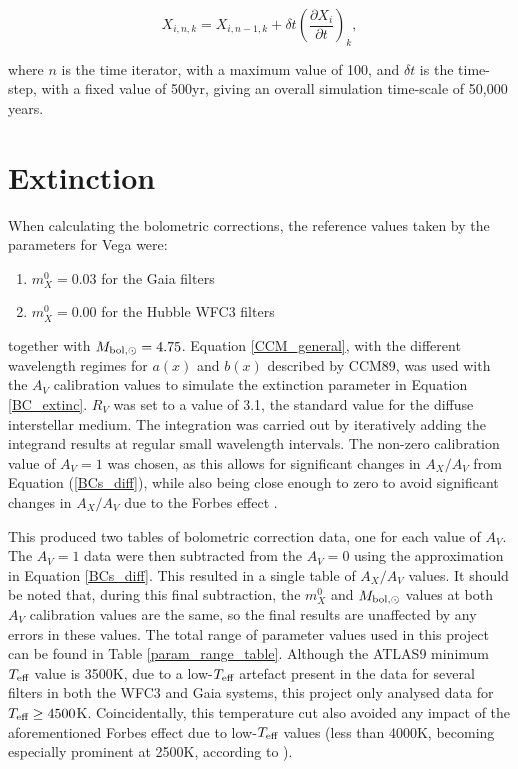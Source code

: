\documentclass[12pt, a4paper]{report}
\begin{document}
\begin{equation}
X_{i,n,k} = X_{i,n-1,k} + \delta t \left( \frac{\partial X_{i}}{\partial t}\right)_{k},
\label{iter_timeind}
\end{equation}

where $n$ is the time iterator, with a maximum value of 100, and $\delta t$ is the time-step, with a fixed value of 500yr, giving an overall simulation time-scale of 50,000 years.

\section{Extinction}
When calculating the bolometric corrections, the reference values taken by the parameters for Vega were:

\begin{enumerate}
\item $m_{X}^{0} = 0.03$ for the Gaia filters
\item $m_{X}^{0} = 0.00$ for the Hubble WFC3 filters
\end{enumerate}

together with $M_{\textnormal{bol},\odot} = 4.75$. Equation \ref{CCM_general}, with the different wavelength regimes for $a(x)$ and $b(x)$ described by CCM89, was used with the $A_{V}$ calibration values to simulate the extinction parameter in Equation \ref{BC_extinc}. $R_{V}$ was set to a value of 3.1, the standard value for the diffuse interstellar medium. The integration was carried out by iteratively adding the integrand results at regular small wavelength intervals. The non-zero calibration value of $A_{V} = 1$ was chosen, as this allows for significant changes in $A_{X}/A_{V}$ from Equation (\ref{BCs_diff}), while also being close enough to zero to avoid significant changes in $A_{X}/A_{V}$ due to the Forbes effect \citep{2008PASP..120..583G}.

This produced two tables of bolometric correction data, one for each value of $A_{V}$. The $A_{V} = 1$ data were then subtracted from the $A_{V} = 0$ using the approximation in Equation \ref{BCs_diff}. This resulted in a single table of $A_{X}/A_{V}$ values. It should be noted that, during this final subtraction, the $m_{X}^{0}$ and $M_{\textnormal{bol},\odot}$ values at both $A_{V}$ calibration values are the same, so the final results are unaffected by any errors in these values.
The total range of parameter values used in this project can be found in Table \ref{param_range_table}. Although the ATLAS9 minimum $T_{\textnormal{eff}}$ value is 3500K, due to a low-$T_{\textnormal{eff}}$ artefact present in the data for several filters in both the WFC3 and Gaia systems, this project only analysed data for $T_{\textnormal{eff}} \geq 4500$K. Coincidentally, this temperature cut also avoided any impact of the aforementioned Forbes effect due to low-$T_{\textnormal{eff}}$ values (less than 4000K, becoming especially prominent at 2500K, according to \cite{2008PASP..120..583G}).
\end{document}
